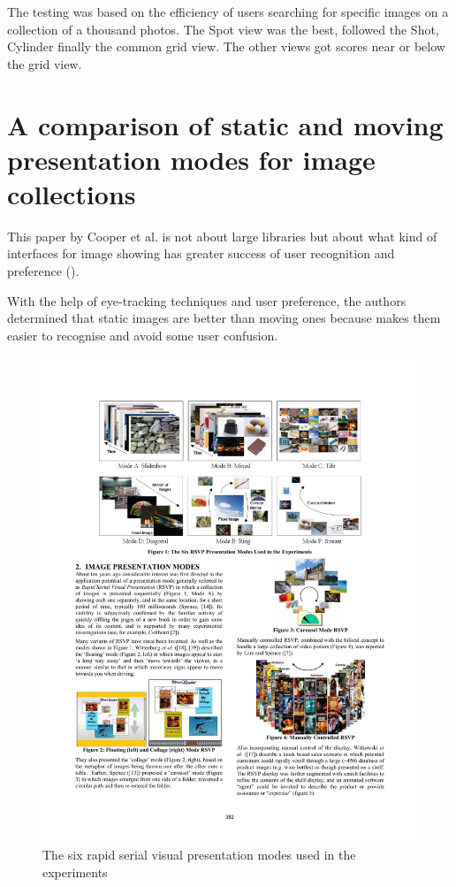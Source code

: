 The testing was based on the efficiency of users searching for specific images on a collection of a thousand photos. The Spot view was the best, followed the Shot, Cylinder finally the common grid view. The other views got scores near or below the grid view.


\section{A comparison of static and moving presentation modes for image collections} %
\label{sub:Cooper}

This paper \cite{Cooper:2006p543} by Cooper et al. is not about large libraries but about what kind of interfaces for image showing has greater success of user recognition and preference ().

With the help of eye-tracking techniques and user preference, the authors determined that static images are better than moving ones because makes them easier to recognise and avoid some user confusion.

\begin{figure}[ht]
	\centering
		\includegraphics[width=\textwidth]{imgs/Cooper1}
	\caption{The six rapid serial visual presentation modes used in the experiments}
	\label{fig:Cooper1}
\end{figure}

